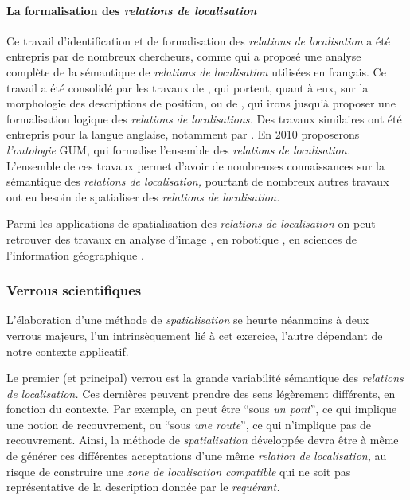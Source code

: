 \paragraph{La formalisation des \emph{relations de localisation}}

Ce travail d'identification et de formalisation des \emph{relations de
  localisation} a été entrepris par de nombreux chercheurs, comme
\textcite{Vandeloise1986} qui a proposé une analyse complète de la
sémantique de \emph{relations de localisation} utilisées en
français. Ce travail a été consolidé par les travaux de
\textcite{Borillo1998}, qui portent, quant à eux, sur la morphologie
des descriptions de position, ou de \textcite{Aurnague1993,
  Aurnague1997}, qui irons jusqu'à proposer une formalisation logique
des \emph{relations de localisations.} Des travaux similaires ont été
entrepris pour la langue anglaise, notamment par
\autocite{Kracht2002,Mark1999,Freksa2018,Carlson2005,Lang1991,Matsakis2010}.
En 2010 \textcite{Bateman2010} proposerons \emph{l'ontologie} GUM, qui
formalise l'ensemble des \emph{relations de localisation.} L'ensemble
de ces travaux permet d'avoir de nombreuses connaissances sur la
sémantique des \emph{relations de localisation,} pourtant de nombreux
autres travaux ont eu besoin de spatialiser des \emph{relations de
  localisation.}

Parmi les applications de spatialisation des \emph{relations de
  localisation} on peut retrouver des travaux en analyse d'image
\autocite{Hudelot2008, Hudelot2008a,Bloch1996, Vanegas2011,
  Takemura2012}, en robotique \autocite{Skubic2004}, en sciences de
l'information géographique
\autocite{Xu2007a,Xu2007,Xu2006,Wolter2018,Dittrich2015,Du2016,Hornsby2009,Mathet2000,Hall2015}.



\subsubsection{Verrous scientifiques}

L’élaboration d'une méthode de \emph{spatialisation} se heurte
néanmoins à deux verrous majeurs, l'un intrinsèquement lié à cet
exercice, l'autre dépendant de notre contexte applicatif.

Le premier (et principal) verrou est la grande variabilité sémantique
des \emph{relations de localisation.} Ces dernières peuvent prendre
des sens légèrement différents, en fonction du contexte. Par exemple,
on peut être \enquote{sous \emph{un pont}}, ce qui implique une notion
de recouvrement, ou \enquote{sous \emph{une route}}, ce qui n'implique
pas de recouvrement. Ainsi, la méthode de \emph{spatialisation}
développée devra être à même de générer ces différentes acceptations
d'une même \emph{relation de localisation,} au risque de construire
une \emph{zone de localisation compatible} qui ne soit pas
représentative de la description donnée par le \emph{requérant.}

